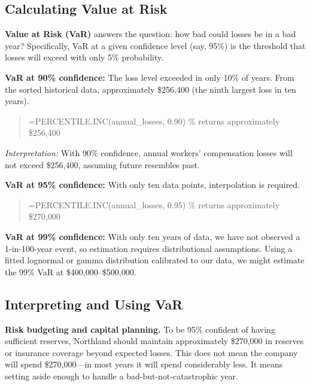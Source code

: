 \documentclass[11pt,openany]{book}
\newenvironment{excelblock}%
  {\begin{quote}\small\ttfamily\setlength{\parskip}{2pt}}%
  {\end{quote}}
\begin{document}
\subsection{Calculating Value at Risk}
\label{subsec:northland-var-calc}

\textbf{Value at Risk (VaR)} answers the question: how bad could losses be in
a bad year? Specifically, VaR at a given confidence level (say, 95\%) is the
threshold that losses will exceed with only 5\% probability.

\textbf{VaR at 90\% confidence:} The loss level exceeded in only 10\% of
years. From the sorted historical data, approximately \$256,400 (the ninth
largest loss in ten years).

\begin{excelblock}
=PERCENTILE.INC(annual\_losses, 0.90)  \% returns approximately \$256,400
\end{excelblock}

\emph{Interpretation:} With 90\% confidence, annual workers' compensation
losses will not exceed \$256,400, assuming future resembles past.

\textbf{VaR at 95\% confidence:} With only ten data points, interpolation is
required.

\begin{excelblock}
=PERCENTILE.INC(annual\_losses, 0.95)  \% returns approximately \$270,000
\end{excelblock}

\textbf{VaR at 99\% confidence:} With only ten years of data, we have not
observed a 1-in-100-year event, so estimation requires distributional
assumptions. Using a fitted lognormal or gamma distribution calibrated to our
data, we might estimate the 99\% VaR at \$400,000--\$500,000.

\subsection{Interpreting and Using VaR}
\label{subsec:northland-interpretation}

\textbf{Risk budgeting and capital planning.} To be 95\% confident of having
sufficient reserves, Northland should maintain approximately \$270,000 in
reserves or insurance coverage beyond expected losses. This does not mean the
company will spend \$270,000---in most years it will spend considerably less.
It means setting aside enough to handle a bad-but-not-catastrophic year.
\end{document}
